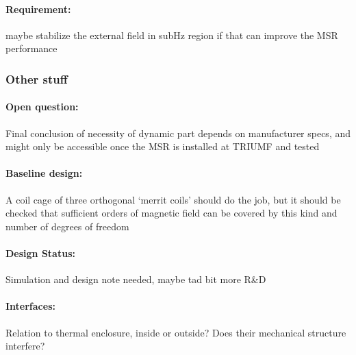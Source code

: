 \paragraph*{Requirement:}
maybe stabilize the external field in subHz region if that can improve the MSR performance

\subsubsection{Other stuff}

\paragraph*{Open question:} Final conclusion of necessity of dynamic part depends on manufacturer specs, and might
only be accessible once the MSR is installed at TRIUMF and tested

\paragraph*{Baseline design:} A coil cage of three orthogonal ‘merrit coils’ should do the job, but it should be checked that
sufficient orders of magnetic field can be covered by this kind and number of degrees of
freedom
\paragraph*{Design Status:} Simulation and design note needed, maybe tad bit more
R\&D
\paragraph*{Interfaces:} Relation to thermal enclosure, inside or outside? Does their mechanical structure interfere?





